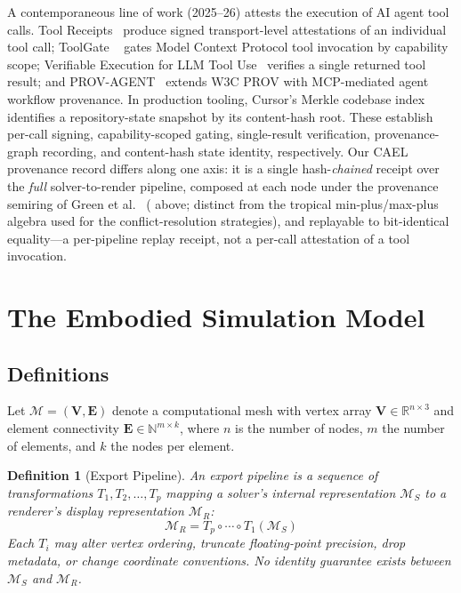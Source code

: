 \documentclass[journal]{IEEEtran}
\newtheorem{definition}{Definition}
\newcommand{\cael}{CAEL}
\begin{document}
A contemporaneous line of work (2025--26) attests the execution of AI agent
tool calls. Tool Receipts~\cite{toolreceipts2026} produce signed
transport-level attestations of an individual tool call; ToolGate%
~\cite{toolgate2026} gates Model Context Protocol tool invocation by
capability scope; Verifiable Execution for LLM Tool
Use~\cite{verifexec2026} verifies a single returned tool result; and
PROV-AGENT~\cite{prov-agent2025} extends W3C PROV with MCP-mediated agent
workflow provenance. In production tooling, Cursor's Merkle codebase
index~\cite{cursormerkle2024} identifies a repository-state snapshot by its
content-hash root. These establish per-call signing, capability-scoped
gating, single-result verification, provenance-graph recording, and
content-hash state identity, respectively. Our \cael{} provenance record
differs along one axis: it is a single hash-\emph{chained} receipt over the
\emph{full} solver-to-render pipeline, composed at each node under the
provenance semiring of Green et al.~\cite{green-semiring2007}
( above; distinct from the tropical
min-plus/max-plus algebra used for the conflict-resolution strategies), and
replayable to bit-identical equality---a per-pipeline replay receipt, not a
per-call attestation of a tool invocation.

\section{The Embodied Simulation Model}
\label{sec:model}

\subsection{Definitions}
\label{sec:model:definitions}

Let $\mathcal{M} = (\mathbf{V}, \mathbf{E})$ denote a computational mesh
with vertex array $\mathbf{V} \in \mathbb{R}^{n \times 3}$ and element
connectivity $\mathbf{E} \in \mathbb{N}^{m \times k}$, where $n$ is the
number of nodes, $m$ the number of elements, and $k$ the nodes per element.

\begin{definition}[Export Pipeline]
An \emph{export pipeline} is a sequence of transformations
$T_1, T_2, \ldots, T_p$ mapping a solver's internal representation
$\mathcal{M}_S$ to a renderer's display representation $\mathcal{M}_R$:
\[
  \mathcal{M}_R = T_p \circ \cdots \circ T_1(\mathcal{M}_S)
\]
Each $T_i$ may alter vertex ordering, truncate floating-point precision,
drop metadata, or change coordinate conventions. No identity guarantee
exists between $\mathcal{M}_S$ and $\mathcal{M}_R$.
\end{definition}
\end{document}
